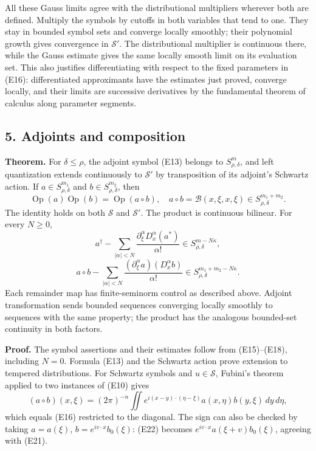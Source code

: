 \documentclass[
  11pt,
]{article}
\begin{document}
All these Gauss limits agree with the distributional multipliers
wherever both are defined. Multiply the symbols by cutoffs in both
variables that tend to one. They stay in bounded symbol sets and
converge locally smoothly; their polynomial growth gives convergence in
\(\mathcal S'\). The distributional multiplier is continuous there,
while the Gauss estimate gives the same locally smooth limit on its
evaluation set. This also justifies differentiating with respect to the
fixed parameters in (E16): differentiated approximants have the
estimates just proved, converge locally, and their limits are successive
derivatives by the fundamental theorem of calculus along parameter
segments.

\subsection{5. Adjoints and composition}\label{adjoints-and-composition}

\textbf{Theorem.} For \(\delta\leq\rho\), the adjoint symbol (E13)
belongs to \(S^m_{\rho,\delta}\), and left quantization extends
continuously to \(\mathcal S'\) by transposition of its adjoint's
Schwartz action. If \(a\in S^{m_1}_{\rho,\delta}\) and
\(b\in S^{m_2}_{\rho,\delta}\), then \[
\operatorname{Op}(a)\operatorname{Op}(b)=\operatorname{Op}(a\circ b),
\quad a\circ b=\mathcal B(x,\xi,x,\xi)
\in S^{m_1+m_2}_{\rho,\delta}.
\tag{E19}
\] The identity holds on both \(\mathcal S\) and \(\mathcal S'\). The
product is continuous bilinear. For every \(N\geq0\), \[
a^\dagger-\sum_{|\alpha|<N}
\frac{\partial_\xi^\alpha D_x^\alpha(a^*)}{\alpha!}
\in S^{m-N\kappa}_{\rho,\delta},
\tag{E20}
\] \[
a\circ b-\sum_{|\alpha|<N}
\frac{(\partial_\xi^\alpha a)(D_x^\alpha b)}{\alpha!}
\in S^{m_1+m_2-N\kappa}_{\rho,\delta}.
\tag{E21}
\] Each remainder map has finite-seminorm control as described above.
Adjoint transformation sends bounded sequences converging locally
smoothly to sequences with the same property; the product has the
analogous bounded-set continuity in both factors.

\textbf{Proof.} The symbol assertions and their estimates follow from
(E15)--(E18), including \(N=0\). Formula (E13) and the Schwartz action
prove extension to tempered distributions. For Schwartz symbols and
\(u\in\mathcal S\), Fubini's theorem applied to two instances of (E10)
gives \[
(a\circ b)(x,\xi)=(2\pi)^{-n}
\iint e^{i(x-y)\cdot(\eta-\xi)}a(x,\eta)b(y,\xi)\,dy\,d\eta,
\tag{E22}
\] which equals (E16) restricted to the diagonal. The sign can also be
checked by taking \(a=a(\xi)\), \(b=e^{iv\cdot x}b_0(\xi)\): (E22)
becomes \(e^{iv\cdot x}a(\xi+v)b_0(\xi)\), agreeing with (E21).
\end{document}
